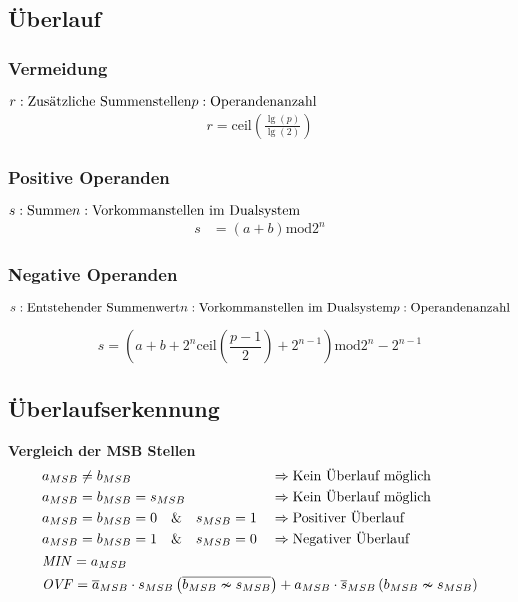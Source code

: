 \subsection{Überlauf}
\begin{multicols}{2}
	\subsubsection{Vermeidung}
	\(
	r: \text{Zusätzliche Summenstellen}\\
	p: \text{Operandenanzahl}
	\)
	\begin{align*}
	r=\text{ceil}\left(\frac{\lg\left(p\right)}{\lg\left(2\right)}\right)
	\end{align*}
	
	\subsubsection{Positive Operanden}
	\(
	s: \text{Summe}\\
	n: \text{Vorkommanstellen im Dualsystem}
	\)
	\begin{align*}
	s&=\left(a+b\right)\text{mod} 2^n
	\end{align*}
\end{multicols}
	
	\subsubsection{Negative Operanden}
	\(
	s: \text{Entstehender Summenwert}\\
	n: \text{Vorkommanstellen im Dualsystem}\\
	p: \text{Operandenanzahl}
	\)

	\[s=\left(a+b+2^n\text{ceil}\left(\frac{p-1}{2}\right)+2^{n-1}\right)\text{mod}
	2^n-2^{n-1}\]

\newpage
\subsection{Überlaufserkennung}
	\textbf{Vergleich der MSB Stellen}
	\begin{align*}
	&\begin{aligned}
	&a_{MSB}\neq b_{MSB}\hfill&&\Rightarrow \text{Kein Überlauf möglich}\\
	&a_{MSB}=b_{MSB}=s_{MSB}&&\Rightarrow \text{Kein Überlauf möglich}\\
	&a_{MSB}=b_{MSB}=0 \quad\&\quad s_{MSB}=1&&\Rightarrow \text{Positiver Überlauf}\\
	&a_{MSB}=b_{MSB}=1 \quad\&\quad s_{MSB}=0&&\Rightarrow \text{Negativer Überlauf}
	\end{aligned}\\
	&\mathit{MIN}=a_{MSB}\\
	&\mathit{OVF}=\overline{a}_{MSB} \cdot s_{MSB}\left(\overline{b_{MSB}\nsim
	s_{MSB}}\right)+a_{MSB} \cdot \overline{s}_{MSB}\left(b_{MSB}\nsim
	s_{MSB}\right)
	\end{align*}
		
